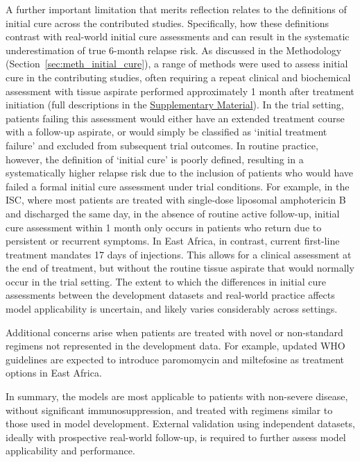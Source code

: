 A further important limitation that merits reflection relates to the definitions of initial cure across the contributed studies. Specifically, how these definitions contrast with real-world initial cure assessments and can result in the systematic underestimation of true 6-month relapse risk. As discussed in the Methodology (Section~\ref{sec:meth_initial_cure}), a range of methods were used to assess initial cure in the contributing studies, often requiring a repeat clinical and biochemical assessment with tissue aspirate performed approximately 1 month after treatment initiation (full descriptions in the \href{https://github.com/jpwil/dphil}{Supplementary Material}). In the trial setting, patients failing this assessment would either have an extended treatment course with a follow-up aspirate, or would simply be classified as `initial treatment failure' and excluded from subsequent trial outcomes. In routine practice, however, the definition of `initial cure' is poorly defined, resulting in a systematically higher relapse risk due to the inclusion of patients who would have failed a formal initial cure assessment under trial conditions. For example, in the ISC, where most patients are treated with single-dose liposomal amphotericin B and discharged the same day, in the absence of routine active follow-up, initial cure assessment within 1 month only occurs in patients who return due to persistent or recurrent symptoms. In East Africa, in contrast, current first-line treatment mandates 17 days of injections. This allows for a clinical assessment at the end of treatment, but without the routine tissue aspirate that would normally occur in the trial setting. The extent to which the differences in initial cure assessments between the development datasets and real-world practice affects model applicability is uncertain, and likely varies considerably across settings.

Additional concerns arise when patients are treated with novel or non-standard regimens not represented in the development data. For example, updated WHO guidelines are expected to introduce paromomycin and miltefosine as treatment options in East Africa\cite{musa2023}.

In summary, the models are most applicable to patients with non-severe disease, without significant immunosuppression, and treated with regimens similar to those used in model development. External validation using independent datasets, ideally with prospective real-world follow-up, is required to further assess model applicability and performance.

